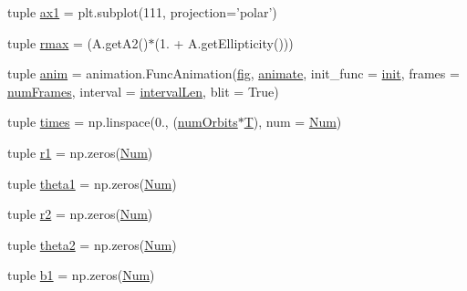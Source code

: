 \begin{DoxyCompactItemize}
\item 
tuple \hyperlink{namespacebinary_s_m_b_h_demo_ab1c5e5f1ec42e9833566bac273380470}{ax1} = plt.\-subplot(111, projection='polar')
\item 
tuple \hyperlink{namespacebinary_s_m_b_h_demo_a74e4ce6514b15b46325ef6ae05f4a3f1}{rmax} = (A.\-get\-A2()$\ast$(1. + A.\-get\-Ellipticity()))
\item 
tuple \hyperlink{namespacebinary_s_m_b_h_demo_af404de73f4c2e94eb4a0a3253e350e56}{anim} = animation.\-Func\-Animation(\hyperlink{namespacebinary_s_m_b_h_demo_a52c6580cc4f2120bbe561e444362eb31}{fig}, \hyperlink{namespacebinary_s_m_b_h_demo_aaa2c7ffa13452e185262237c6242e2cc}{animate}, init\-\_\-func = \hyperlink{namespacebinary_s_m_b_h_demo_a33ff1bc707fd0b6d5c62b03c5db2eaf0}{init}, frames = \hyperlink{namespacebinary_s_m_b_h_demo_a2a395de684eed7859ba5e04338595253}{num\-Frames}, interval = \hyperlink{namespacebinary_s_m_b_h_demo_af275b72ef534a7d65cad36eb28c582f5}{interval\-Len}, blit = True)
\item 
tuple \hyperlink{namespacebinary_s_m_b_h_demo_a4559d154f36f640c55cd7fe2d2be1fa6}{times} = np.\-linspace(0., (\hyperlink{namespacebinary_s_m_b_h_demo_a6fd042d16c07f82a55f4f905c563c0d9}{num\-Orbits}$\ast$\hyperlink{namespacebinary_s_m_b_h_demo_a6e3697d31caf5b65c8bee29546abe4ff}{T}), num = \hyperlink{namespacebinary_s_m_b_h_demo_a20af80bc8ad6317c9f48f3c8974ae34e}{Num})
\item 
tuple \hyperlink{namespacebinary_s_m_b_h_demo_afa2c1a69396867f79d8fa488b78a5d4a}{r1} = np.\-zeros(\hyperlink{namespacebinary_s_m_b_h_demo_a20af80bc8ad6317c9f48f3c8974ae34e}{Num})
\item 
tuple \hyperlink{namespacebinary_s_m_b_h_demo_a39ae44217953e527dae779e7352ac627}{theta1} = np.\-zeros(\hyperlink{namespacebinary_s_m_b_h_demo_a20af80bc8ad6317c9f48f3c8974ae34e}{Num})
\item 
tuple \hyperlink{namespacebinary_s_m_b_h_demo_a8492099467bf0c8cdeea92c96d291d72}{r2} = np.\-zeros(\hyperlink{namespacebinary_s_m_b_h_demo_a20af80bc8ad6317c9f48f3c8974ae34e}{Num})
\item 
tuple \hyperlink{namespacebinary_s_m_b_h_demo_a45b253d55eb0b14ab6802f7b02bf5cf3}{theta2} = np.\-zeros(\hyperlink{namespacebinary_s_m_b_h_demo_a20af80bc8ad6317c9f48f3c8974ae34e}{Num})
\item 
tuple \hyperlink{namespacebinary_s_m_b_h_demo_a0af6084664694df5039ec3df3d668af2}{b1} = np.\-zeros(\hyperlink{namespacebinary_s_m_b_h_demo_a20af80bc8ad6317c9f48f3c8974ae34e}{Num})
\item 

\end{DoxyCompactItemize}
